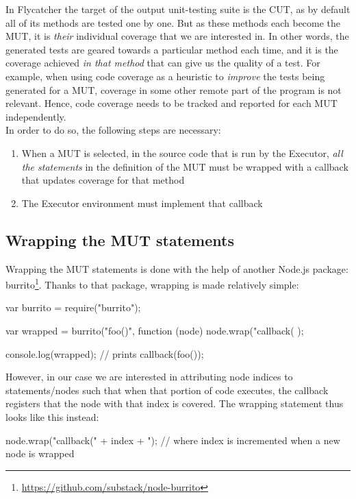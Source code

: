 In \textsf{Flycatcher} the target of the output unit-testing suite is the CUT, as by default all of its methods are tested one by one. But as these methods each become the MUT, it is \emph{their} individual coverage that we are interested in. In other words, the generated tests are geared towards a particular method each time, and it is the coverage achieved \emph{in that method} that can give us the quality of a test. For example, when using code coverage as a heuristic to \emph{improve} the tests being generated for a MUT, coverage in some other remote part of the program is not relevant. Hence, code coverage needs to be tracked and reported for each MUT independently.\\

In order to do so, the following steps are necessary:
\begin{enumerate}
   \item When a MUT is selected, in the source code that is run by the \textsf{Executor}, \emph{all the statements} in the definition of the MUT must be wrapped with a callback that updates coverage for that method
   \item The \textsf{Executor} environment must implement that callback
\end{enumerate}

\subsection{Wrapping the MUT statements}
Wrapping the MUT statements is done with the help of another Node.js package: \textsf{burrito}\footnote{\url{https://github.com/substack/node-burrito}}. Thanks to that package, wrapping is made relatively simple:

\begin{code}[caption=Wrapping with \textsf{burrito},label=burrito]
   var burrito = require("burrito");
   
   var wrapped = burrito("foo()", function (node) {
       node.wrap("callback(%
   });
   
   console.log(wrapped); // prints callback(foo());
\end{code}

However, in our case we are interested in attributing node indices to statements/nodes such that when that portion of code executes, the callback registers that the node with that index is covered. The wrapping statement thus looks like this instead:

\begin{code}
node.wrap("callback(" + index + "); %
// where index is incremented when a new node is wrapped
\end{code}

